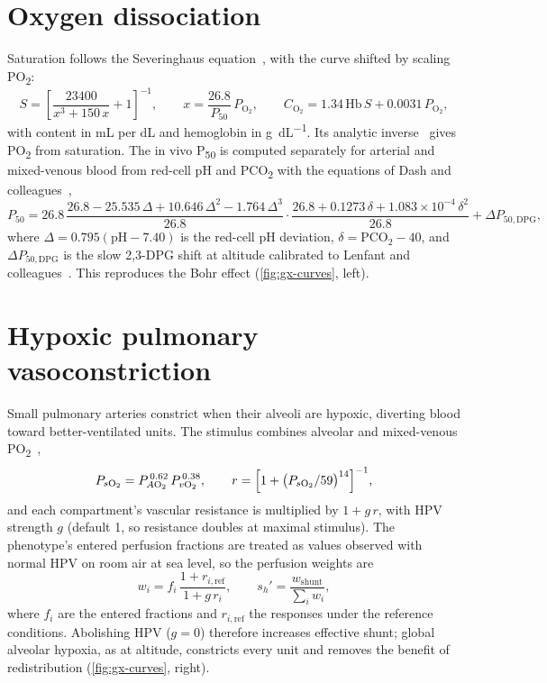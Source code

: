\section{Oxygen dissociation}
\label{sec:gx-odc}
Saturation follows the Severinghaus equation~\citep{severinghaus1979}, with the curve shifted by scaling PO\textsubscript{2}:
\begin{equation}
S = \left[\frac{23400}{x^3 + 150\,x} + 1\right]^{-1},\qquad x = \frac{26.8}{P_{50}}\,P_{\mathrm{O_2}},\qquad
C_{\mathrm{O_2}} = 1.34\,\mathrm{Hb}\,S + 0.0031\,P_{\mathrm{O_2}},
\label{eq:gx-odc}
\end{equation}
with content in \si{\milli\liter} per \si{\deci\liter} and hemoglobin in \si{\gram\per\deci\liter}. Its analytic inverse~\citep{ellis1989} gives PO\textsubscript{2} from saturation. The in vivo P\textsubscript{50} is computed separately for arterial and mixed-venous blood from red-cell pH and PCO\textsubscript{2} with the equations of Dash and colleagues~\citep{dash2016},
\begin{equation}
P_{50} = 26.8\,\frac{26.8 - 25.535\,\Delta + 10.646\,\Delta^2 - 1.764\,\Delta^3}{26.8}\cdot\frac{26.8 + 0.1273\,\delta + 1.083\times10^{-4}\,\delta^2}{26.8} + \Delta P_{50,\mathrm{DPG}},
\label{eq:gx-p50}
\end{equation}
where $\Delta = 0.795(\mathrm{pH} - 7.40)$ is the red-cell pH deviation, $\delta = \mathrm{PCO_2} - 40$, and $\Delta P_{50,\mathrm{DPG}}$ is the slow 2,3-DPG shift at altitude calibrated to Lenfant and colleagues~\citep{lenfant1968}. This reproduces the Bohr effect (\cref{fig:gx-curves}, left).

\section{Hypoxic pulmonary vasoconstriction}
\label{sec:gx-hpv}
Small pulmonary arteries constrict when their alveoli are hypoxic, diverting blood toward better-ventilated units. The stimulus combines alveolar and mixed-venous PO\textsubscript{2}~\citep{marshall1980},
\begin{equation}
P_{s\mathrm{O_2}} = P_{A\mathrm{O_2}}^{\,0.62}\,P_{v\mathrm{O_2}}^{\,0.38},\qquad
r = \Bigl[1 + \bigl(P_{s\mathrm{O_2}}/59\bigr)^{14}\Bigr]^{-1},
\label{eq:gx-hpv}
\end{equation}
and each compartment's vascular resistance is multiplied by $1 + g\,r$, with HPV strength $g$ (default 1, so resistance doubles at maximal stimulus). The phenotype's entered perfusion fractions are treated as values observed with normal HPV on room air at sea level, so the perfusion weights are
\begin{equation}
w_i = f_i\,\frac{1 + r_{i,\mathrm{ref}}}{1 + g\,r_i},\qquad s_h' = \frac{w_{\mathrm{shunt}}}{\sum_i w_i},
\label{eq:gx-hpvw}
\end{equation}
where $f_i$ are the entered fractions and $r_{i,\mathrm{ref}}$ the responses under the reference conditions. Abolishing HPV ($g = 0$) therefore increases effective shunt; global alveolar hypoxia, as at altitude, constricts every unit and removes the benefit of redistribution (\cref{fig:gx-curves}, right).

